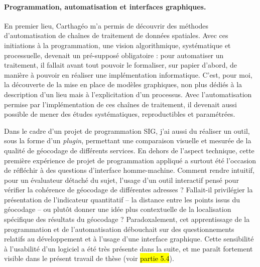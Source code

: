 \paragraph{Programmation, automatisation et interfaces graphiques.}
En premier lieu, Carthagéo m'a permis de découvrir des méthodes d'automatisation de chaînes de traitement de données spatiales.
Avec ces initiations à la programmation, une vision algorithmique, systématique et processuelle, devenait un pré-supposé obligatoire : pour automatiser un traitement, il fallait avant tout pouvoir le formaliser, sur papier d'abord, de manière à pouvoir en réaliser une implémentation informatique.
C'est, pour moi, la découverte de la mise en place de modèles graphiques, non plus dédiés à la description d'un lieu mais à l'explicitation d'un processus.
Avec l'automatisation permise par l'implémentation de ces chaînes de traitement, il devenait aussi possible de mener des études systématiques, reproductibles et paramétrées.

Dans le cadre d'un projet de programmation SIG, j'ai aussi du réaliser un outil, sous la forme d'un \textit{plugin}, permettant une comparaison visuelle et mesurée de la qualité de géocodage de différents services.
En dehors de l'aspect technique, cette première expérience de projet de programmation appliqué a surtout été l'occasion de réfléchir à des questions d'interface homme-machine.
Comment rendre intuitif, pour un évaluateur détaché du sujet, l'usage d'un outil interactif pensé pour vérifier la cohérence de géocodage de différentes adresses ? Fallait-il privilégier la présentation de l'indicateur quantitatif  -- la distance entre les points issus du géocodage -- ou plutôt donner une idée plus contextuelle de la localisation spécifique des résultats du géocodage ?
Paradoxalement, cet apprentissage de la programmation et de l'automatisation débouchait sur des questionnements relatifs au développement et à l'usage d'une interface graphique.
Cette sensibilité à l'\og usabilité\fg{} d'un logiciel a été très présente dans la suite, et me paraît fortement visible dans le présent travail de thèse (voir \hl{partie 5.4}).

